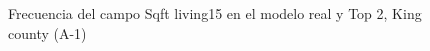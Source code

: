\begin{figure}[H]
    \centering
    
    \caption{Frecuencia del campo Sqft living15 en el modelo real y Top 2, King county (A-1)}
    \label{frecuency-top2-sqft living15}
\end{figure}
